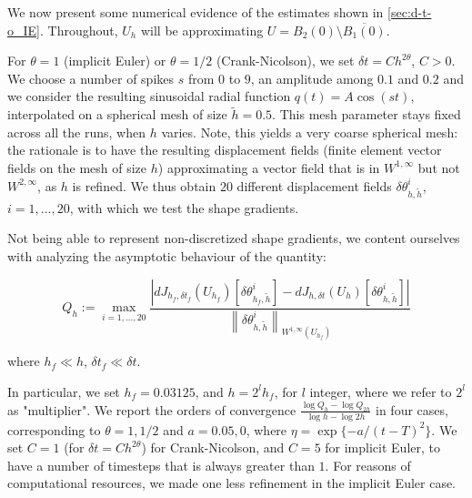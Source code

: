 \documentclass[english,a4paper,9pt,oneside]{scrbook}	%
\theoremstyle{break}
\theoremstyle{remark}
\newcommand{\ds}{\displaystyle}
\newcommand{\norm}[1]{\left\lVert#1\right\rVert}
\newcommand{\te}{\theta}
\begin{document}
We now present some numerical evidence of the estimates shown in \cref{sec:d-t-o_IE}. Throughout, $U_h$ will be approximating $U = B_2(0)\setminus \overline{B_1(0)}$.

For $\theta=1$ (implicit Euler) or $\theta=1/2$ (Crank-Nicolson), we set $\delta t = C h^{2\theta}$, $C>0$. We choose a number of spikes $s$ from $0$ to $9$, an amplitude among $0.1$ and $0.2$ and we consider the resulting sinusoidal radial function $q(t) = A \cos(st)$, interpolated on a spherical mesh of size $\tilde{h} = 0.5$. This mesh parameter stays fixed across all the runs, when $h$ varies. Note, this yields a very coarse spherical mesh: the rationale is to have the resulting displacement fields (finite element vector fields on the mesh of size $h$) approximating a vector field that is in $W^{1,\infty}$ but not $W^{2,\infty}$, as $h$ is refined. We thus obtain $20$ different displacement fields $\delta \te_{h,\tilde{h}}^i$, $i=1,...,20$, with which we test the shape gradients.  


Not being able to represent non-discretized shape gradients, we content ourselves with analyzing the asymptotic behaviour of the quantity:

$$Q_h:=\max_{i=1,...,20}\frac{|dJ_{h_f,\delta t_f}(U_{h_f})[\delta \te_{h_f,\tilde{h}}^i]-dJ_{h,\delta t}(U_h)[\delta \te_{h,\tilde{h}}^i]|}{\norm{\delta \te_{h,\tilde{h}}^i}_{W^{1,\infty}(U_{h_f})}}$$

where $h_f \ll h$, $\delta t_f \ll \delta t$.

In particular, we set $h_f = 0.03125$, and $h = 2^l h_f$, for $l$ integer, where we refer to $2^l$ as "multiplier". We report the orders of convergence $\ds \frac{\log Q_h-\log Q_{2h}}{\log h - \log 2h}$ in four cases, corresponding to $\theta =1, 1/2$ and $a = 0.05, 0$, where $\eta =\exp\{-a/(t-T)^2\} $. We set $C=1$ (for $\delta t = C h^{2\theta}$) for Crank-Nicolson, and $C=5$ for implicit Euler, to have a number of timesteps that is always greater than $1$. For reasons of computational resources, we made one less refinement in the implicit Euler case.
%
\end{document}
